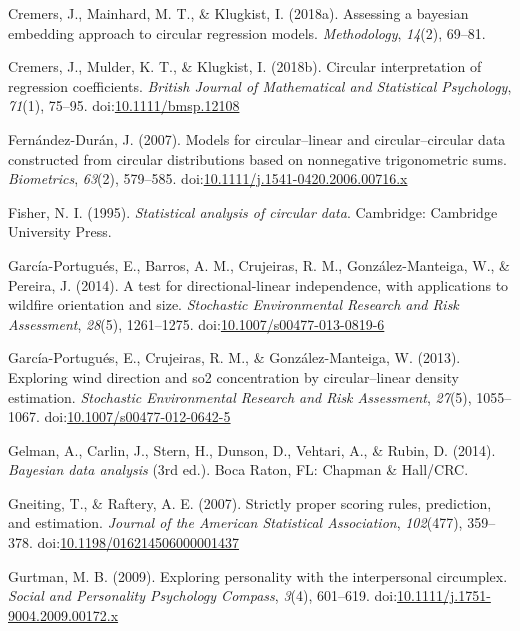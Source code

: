 \documentclass[11pt,]{article}
\begin{document}
\hypertarget{ref-Cremers2018Assessing}{}
Cremers, J., Mainhard, M. T., \& Klugkist, I. (2018a). Assessing a
bayesian embedding approach to circular regression models.
\emph{Methodology}, \emph{14}(2), 69--81.

\hypertarget{ref-CremersMulderKlugkist2017}{}
Cremers, J., Mulder, K. T., \& Klugkist, I. (2018b). Circular
interpretation of regression coefficients. \emph{British Journal of
Mathematical and Statistical Psychology}, \emph{71}(1), 75--95.
doi:\href{https://doi.org/10.1111/bmsp.12108}{10.1111/bmsp.12108}

\hypertarget{ref-fernandez2007models}{}
Fernández-Durán, J. (2007). Models for circular--linear and
circular--circular data constructed from circular distributions based on
nonnegative trigonometric sums. \emph{Biometrics}, \emph{63}(2),
579--585.
doi:\href{https://doi.org/10.1111/j.1541-0420.2006.00716.x}{10.1111/j.1541-0420.2006.00716.x}

\hypertarget{ref-fisher1995statistical}{}
Fisher, N. I. (1995). \emph{Statistical analysis of circular data}.
Cambridge: Cambridge University Press.

\hypertarget{ref-garcia2014test}{}
García-Portugués, E., Barros, A. M., Crujeiras, R. M.,
González-Manteiga, W., \& Pereira, J. (2014). A test for
directional-linear independence, with applications to wildfire
orientation and size. \emph{Stochastic Environmental Research and Risk
Assessment}, \emph{28}(5), 1261--1275.
doi:\href{https://doi.org/10.1007/s00477-013-0819-6}{10.1007/s00477-013-0819-6}

\hypertarget{ref-garcia2013exploring}{}
García-Portugués, E., Crujeiras, R. M., \& González-Manteiga, W. (2013).
Exploring wind direction and so2 concentration by circular--linear
density estimation. \emph{Stochastic Environmental Research and Risk
Assessment}, \emph{27}(5), 1055--1067.
doi:\href{https://doi.org/10.1007/s00477-012-0642-5}{10.1007/s00477-012-0642-5}

\hypertarget{ref-BDA}{}
Gelman, A., Carlin, J., Stern, H., Dunson, D., Vehtari, A., \& Rubin, D.
(2014). \emph{Bayesian data analysis} (3rd ed.). Boca Raton, FL: Chapman
\& Hall/CRC.

\hypertarget{ref-gneiting2007strictly}{}
Gneiting, T., \& Raftery, A. E. (2007). Strictly proper scoring rules,
prediction, and estimation. \emph{Journal of the American Statistical
Association}, \emph{102}(477), 359--378.
doi:\href{https://doi.org/10.1198/016214506000001437}{10.1198/016214506000001437}

\hypertarget{ref-gurtman2009exploring}{}
Gurtman, M. B. (2009). Exploring personality with the interpersonal
circumplex. \emph{Social and Personality Psychology Compass},
\emph{3}(4), 601--619.
doi:\href{https://doi.org/10.1111/j.1751-9004.2009.00172.x}{10.1111/j.1751-9004.2009.00172.x}
\end{document}
